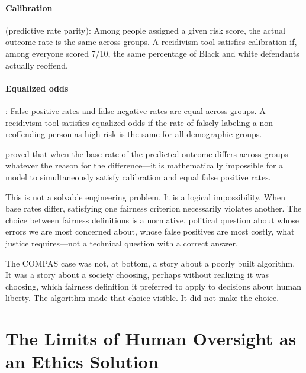 \paragraph{Calibration} (predictive rate parity): Among people assigned a given risk score, the actual outcome rate is the same across groups. A recidivism tool satisfies calibration if, among everyone scored 7/10, the same percentage of Black and white defendants actually reoffend.

\paragraph{Equalized odds}: False positive rates and false negative rates are equal across groups. A recidivism tool satisfies equalized odds if the rate of falsely labeling a non-reoffending person as high-risk is the same for all demographic groups.

\textcite{chouldechova2017fair} proved that when the base rate of the predicted outcome differs across groups---whatever the reason for the difference---it is mathematically impossible for a model to simultaneously satisfy calibration and equal false positive rates.

\begin{cautionbox}
This is not a solvable engineering problem. It is a logical impossibility. When base rates differ, satisfying one fairness criterion necessarily violates another. The choice between fairness definitions is a normative, political question about whose errors we are most concerned about, whose false positives are most costly, what justice requires---not a technical question with a correct answer.

The COMPAS case was not, at bottom, a story about a poorly built algorithm. It was a story about a society choosing, perhaps without realizing it was choosing, which fairness definition it preferred to apply to decisions about human liberty. The algorithm made that choice visible. It did not make the choice.
\end{cautionbox}

\section{The Limits of Human Oversight as an Ethics Solution}
\label{sec:ch14-limits-oversight}

